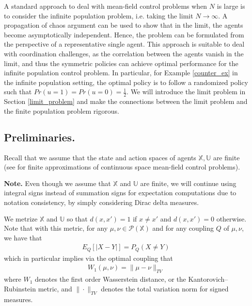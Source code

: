 \documentclass[twoside,11pt]{article}
\def\P{{\mathcal P}}
\begin{document}
A standard approach to deal with mean-field control problems when $N$ is large is to consider the infinite population problem, i.e. taking the limit $N\to \infty$. A propagation of chaos argument can be used to show that in the limit, the agents become asymptotically independent. Hence, the problem can be formulated from the perspective of a representative single agent.  This approach is suitable to deal with coordination challenges, as the correlation between the agents vanish in the limit, and thus the symmetric policies can achieve optimal performance for the infinite population control problem. In particular, for Example \ref{counter_ex} in the infinite population setting, the optimal policy is to follow a randomized policy such that $Pr(u=1)=Pr(u=0)=\frac{1}{2}$. We will introduce  the limit problem  in Section \ref{limit_problem} and make the connections between the limit problem and the finite population problem rigorous.



\subsection{Preliminaries.} 

Recall that we assume that the state and action spaces of agents $\mathds{X,U}$ are finite (see \cite{bayraktar2023finite} for finite approximations of continuous space mean-field control problems). 

{\bf Note.} Even though we assume that $\mathds{X}$ and $\mathds{U}$ are finite, we will continue using integral signs instead of summation signs for expectation computations due to notation consistency, by simply considering Dirac delta measures.

We metrize $\mathds{X}$ and $\mathds{U}$ so that $d(x,x')=1$ if $x\neq x'$ and $d(x,x')=0$ otherwise. Note that with this metric, for any $\mu,\nu\in\P(\mathds{X})$ and for any coupling $Q$ of $\mu,\nu$, we have that
\begin{align*}
E_Q\left[|X-Y|\right]= P_Q(X\neq Y)
\end{align*}
which in particular implies  via the optimal coupling that 
\begin{align*}
W_1(\mu,\nu)=\|\mu-\nu\|_{TV}
\end{align*}
where $W_1$ denotes the first order Wasserstein distance, or the Kantorovich–Rubinstein metric, and $\|\cdot\|_{TV}$ denotes the total variation norm for signed measures.
\end{document}
